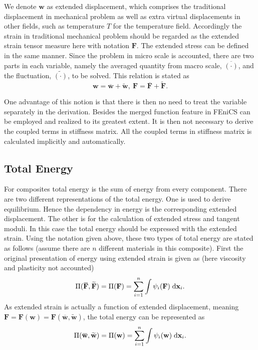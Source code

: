 We denote $\mathbf{w}$ as extended displacement, which comprises the traditional displacement in mechanical problem as well as extra virtual displacements in other fields, such as temperature $T$ for the temperature field. Accordingly the strain in traditional mechanical problem should be regarded as the extended strain tensor measure here with notation $\mathbf{F}$. The extended stress can be defined in the same manner. Since the problem in micro scale is accounted, there are two parts in each variable, namely the averaged quantity from macro scale, $\overbar{(\cdot)}$, and the fluctuation, $\widetilde{(\cdot)}$, to be solved. This relation is stated as
\begin{equation}
\label{eq: decomp}
\mathbf{w} = \overbar{\mathbf{w}} + \widetilde{\mathbf{w}}, \ \mathbf{F} = \overbar{\mathbf{F}} + \widetilde{\mathbf{F}}.
\end{equation}

One advantage of this notion is that there is then no need to treat the variable separately in the derivation. Besides the merged function feature in FEniCS can be employed and realized to its greatest extent. It is then not necessary to derive the coupled terms in stiffness matrix. All the coupled terms in stiffness matrix is calculated implicitly and automatically.

\subsection{Total Energy}
For composites total energy is the sum of energy from every component. There are two different representations of the total energy. One is used to derive equilibrium. Hence the dependency in energy is the corresponding extended displacement. The other is for the calculation of extended stress and tangent moduli. In this case the total energy should be expressed with the extended strain. Using the notation given above, these two types of total energy are stated as follows (assume there are $n$ different materials in this composite). First the original presentation of energy using extended strain is given as (here viscosity and plasticity not accounted) 
\begin{equation}
\label{eq: strain energy}
\Pi(\overbar{\mathbf{F}}, \widetilde{\mathbf{F}}) = \Pi(\mathbf{F}) = \sum^{n}_{i=1} \int \psi_{i}(\mathbf{F}) \myd{\mathbf{x}_{i}}.
\end{equation}
As extended strain is actually a function of extended displacement, meaning $\mathbf{F}=\mathbf{F}(\mathbf{w})=\mathbf{F}(\overbar{\mathbf{w}}, \widetilde{\mathbf{w}})$, the total energy can be represented as
\begin{equation}
\label{eq: disp energy}
\Pi(\overbar{\mathbf{w}}, \widetilde{\mathbf{w}}) = \Pi(\mathbf{w}) = \sum^{n}_{i=1} \int \psi_{i}(\mathbf{w}) \myd{\mathbf{x}_{i}}.
\end{equation} 

